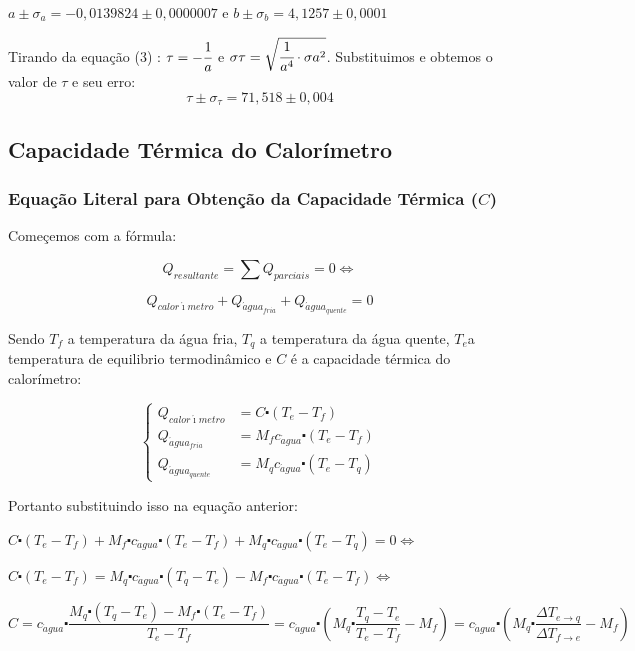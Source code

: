 \documentclass[a4paper]{article}
\begin{document}
	$a \pm \sigma_a  =-0,0139824\pm0,0000007$ e $b \pm \sigma_b  =4,1257\pm0,0001$
	
	Tirando da equação (3) : $\tau = -\cfrac{1}{a}$ e $\sigma \tau = \sqrt{\cfrac{1}{a^4} \cdot \sigma a^2}$. Substituimos e obtemos o valor de $\tau$ e seu erro:
	$$ \tau \pm \sigma_{\tau} = 71,518\pm0,004 $$


	\subsection{Capacidade Térmica do Calorímetro}


		\subsubsection{Equação Literal para Obtenção da Capacidade Térmica ($C$)}

			Começemos com a fórmula:

			$$Q_{resultante}={\displaystyle \sum Q_{parciais}=0}\Leftrightarrow$$


			\begin{equation}
				Q_{calor\acute{\imath}metro}+Q_{\acute{a}gua_{fria}}+Q_{\acute{a}gua_{quente}}=0
			\end{equation}


			Sendo $T_{f}$ a temperatura da água fria, $T_{q}$ a temperatura da água quente, $T_{e}$a temperatura de equilibrio termodinâmico e $C$ é a capacidade térmica do calorímetro:

			\[
			\begin{cases}
				Q_{calor\acute{\imath}metro} & =C\centerdot(T_{e}-T_{f})\\
				Q_{\acute{a}gua_{fria}} & =M_{f}c_{\acute{a}gua}\centerdot(T_{e}-T_{f})\\
				Q_{\acute{a}gua_{quente}} & =M_{q}c_{\acute{a}gua}\centerdot(T_{e}-T_{q})
			\end{cases}
			\]


			Portanto substituindo isso na equação anterior:

			$C\centerdot(T_{e}-T_{f})+M_{f}\centerdot c_{\acute{a}gua}\centerdot(T_{e}-T_{f})+M_{q}\centerdot c_{\acute{a}gua}\centerdot(T_{e}-T_{q})=0\Longleftrightarrow$

			$C\centerdot(T_{e}-T_{f})=M_{q}\centerdot c_{\acute{a}gua}\centerdot(T_{q}-T_{e})-M_{f}\centerdot c_{\acute{a}gua}\centerdot(T_{e}-T_{f})\Longleftrightarrow$

			$C=c_{\acute{a}gua}\centerdot\dfrac{M_{q}\centerdot(T_{q}-T_{e})-M_{f}\centerdot(T_{e}-T_{f})}{T_{e}-T_{f}}=c_{\acute{a}gua}\centerdot\left(M_{q}\centerdot\dfrac{T_{q}-T_{e}}{T_{e}-T_{f}}-M_{f}\right)=c_{\acute{a}gua}\centerdot\left(M_{q}\centerdot\dfrac{\Delta T_{e\rightarrow q}}{\Delta T_{f\rightarrow e}}-M_{f}\right)$
\end{document}
